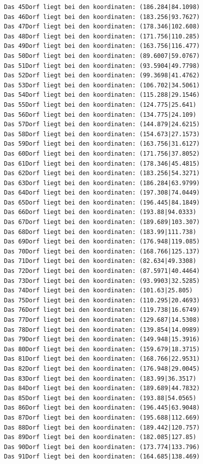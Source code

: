 \documentclass{article}
\begin{document}
\begin{verbatim}
Das 45Dorf liegt bei den koordinaten: (186.284|84.1098)
Das 46Dorf liegt bei den koordinaten: (183.256|93.7627)
Das 47Dorf liegt bei den koordinaten: (178.346|102.608)
Das 48Dorf liegt bei den koordinaten: (171.756|110.285)
Das 49Dorf liegt bei den koordinaten: (163.756|116.477)
Das 50Dorf liegt bei den koordinaten: (89.6007|59.0767)
Das 51Dorf liegt bei den koordinaten: (93.5904|49.7798)
Das 52Dorf liegt bei den koordinaten: (99.3698|41.4762)
Das 53Dorf liegt bei den koordinaten: (106.702|34.5061)
Das 54Dorf liegt bei den koordinaten: (115.288|29.1546)
Das 55Dorf liegt bei den koordinaten: (124.775|25.641)
Das 56Dorf liegt bei den koordinaten: (134.775|24.109)
Das 57Dorf liegt bei den koordinaten: (144.879|24.6215)
Das 58Dorf liegt bei den koordinaten: (154.673|27.1573)
Das 59Dorf liegt bei den koordinaten: (163.756|31.6127)
Das 60Dorf liegt bei den koordinaten: (171.756|37.8052)
Das 61Dorf liegt bei den koordinaten: (178.346|45.4815)
Das 62Dorf liegt bei den koordinaten: (183.256|54.3271)
Das 63Dorf liegt bei den koordinaten: (186.284|63.9799)
Das 64Dorf liegt bei den koordinaten: (197.308|74.0449)
Das 65Dorf liegt bei den koordinaten: (196.445|84.1849)
Das 66Dorf liegt bei den koordinaten: (193.88|94.0333)
Das 67Dorf liegt bei den koordinaten: (189.689|103.307)
Das 68Dorf liegt bei den koordinaten: (183.99|111.738)
Das 69Dorf liegt bei den koordinaten: (176.948|119.085)
Das 70Dorf liegt bei den koordinaten: (168.766|125.137)
Das 71Dorf liegt bei den koordinaten: (82.634|49.3308)
Das 72Dorf liegt bei den koordinaten: (87.5971|40.4464)
Das 73Dorf liegt bei den koordinaten: (93.9903|32.5285)
Das 74Dorf liegt bei den koordinaten: (101.63|25.805)
Das 75Dorf liegt bei den koordinaten: (110.295|20.4693)
Das 76Dorf liegt bei den koordinaten: (119.738|16.6749)
Das 77Dorf liegt bei den koordinaten: (129.687|14.5308)
Das 78Dorf liegt bei den koordinaten: (139.854|14.0989)
Das 79Dorf liegt bei den koordinaten: (149.948|15.3916)
Das 80Dorf liegt bei den koordinaten: (159.679|18.3715)
Das 81Dorf liegt bei den koordinaten: (168.766|22.9531)
Das 82Dorf liegt bei den koordinaten: (176.948|29.0045)
Das 83Dorf liegt bei den koordinaten: (183.99|36.3517)
Das 84Dorf liegt bei den koordinaten: (189.689|44.7832)
Das 85Dorf liegt bei den koordinaten: (193.88|54.0565)
Das 86Dorf liegt bei den koordinaten: (196.445|63.9048)
Das 87Dorf liegt bei den koordinaten: (195.688|112.669)
Das 88Dorf liegt bei den koordinaten: (189.442|120.757)
Das 89Dorf liegt bei den koordinaten: (182.085|127.85)
Das 90Dorf liegt bei den koordinaten: (173.774|133.796)
Das 91Dorf liegt bei den koordinaten: (164.685|138.469)

\end{verbatim}
\end{document}
